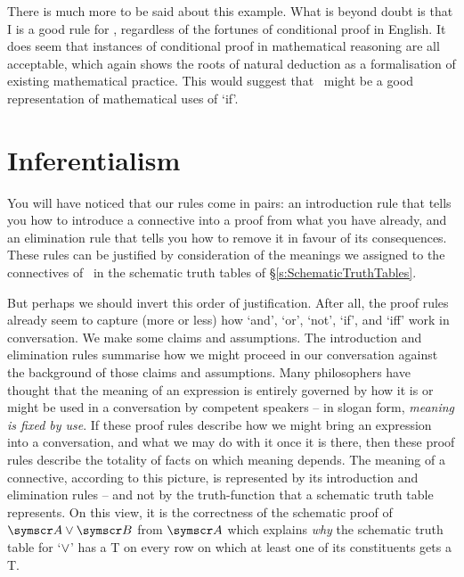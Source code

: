 There is much more to be said about this example. What is beyond doubt is that {\eif}I is a good rule for \TFL, regardless of the fortunes of conditional proof in English. It does seem that instances of conditional proof in mathematical reasoning are all acceptable, which again shows the roots of natural deduction as a formalisation of existing mathematical practice. This would suggest that \eif\ might be a good representation of mathematical uses of `if'.


\section{Inferentialism}\label{inferentialism}

You will have noticed that our rules come in pairs: an introduction rule that tells you how to introduce a connective into a proof from what you have already, and an elimination rule that tells you how to remove it in favour of its consequences. These rules can be justified by consideration of the meanings we assigned to the connectives of \TFL\ in the schematic truth tables of §\ref{s:SchematicTruthTables}.

But perhaps we should invert this order of justification. After all, the proof rules already seem to capture (more or less) how `and', `or', `not', `if', and `iff' work in conversation. We make some claims and assumptions. The introduction and elimination rules summarise how we might proceed in our conversation against the background of those claims and assumptions. Many philosophers have thought that the meaning of an expression is entirely governed by how it is or might be used in a conversation by competent speakers – in slogan form, \emph{meaning is fixed by use}. If these proof rules describe how we might bring an expression into a conversation, and what we may do with it once it is there, then these proof rules describe the totality of facts on which meaning depends. The meaning of a connective, according to this  picture, is represented by its introduction and elimination rules – and not by the truth-function that a schematic truth table represents. On this view, it is the correctness of the schematic proof of $\meta{A}\eor\meta{B}$ from $\meta{A}$ which explains \emph{why} the schematic truth table for `$\vee$' has a T on every row on which at least one of its constituents gets a T. 

